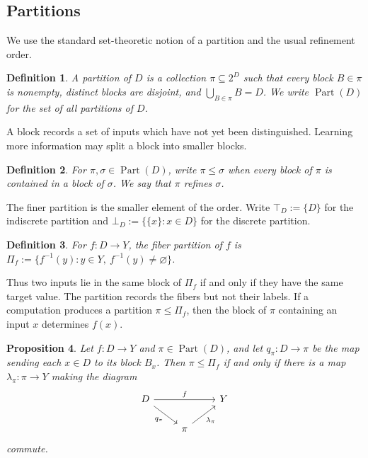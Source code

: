 \documentclass[11pt]{article}
\numberwithin{equation}{section}
\newtheorem{definition}{Definition}[section]
\newtheorem{proposition}[definition]{Proposition}
\theoremstyle{remark}
\newcommand{\Part}{\operatorname{Part}}
\begin{document}
\subsection{Partitions}
\label{subsec:partitions}

We use the standard set-theoretic notion of a partition and the usual
refinement order.

\begin{definition}
\label{def:partition}
A \emph{partition} of $D$ is a collection $\pi\subseteq 2^D$ such that every
block $B\in\pi$ is nonempty, distinct blocks are disjoint, and
$\bigcup_{B\in\pi}B=D$.  We write $\Part(D)$ for the set of all partitions
of $D$.
\end{definition}

A block records a set of inputs which have not yet been distinguished.
Learning more information may split a block into smaller blocks.

\begin{definition}
\label{def:partition-refinement}
For $\pi,\sigma\in\Part(D)$, write $\pi\leq\sigma$ when every block of
$\pi$ is contained in a block of $\sigma$.  We say that $\pi$ \emph{refines}
$\sigma$.
\end{definition}

The finer partition is the smaller element of the order.  Write
$\top_D:=\{D\}$ for the indiscrete partition and
$\bot_D:=\{\{x\}:x\in D\}$ for the discrete partition.

\begin{definition}
\label{def:fiber-partition}
For $f:D\to Y$, the \emph{fiber partition} of $f$ is $\Pi_f:=\{f^{-1}(y):y\in Y,\ f^{-1}(y)\neq\varnothing\}$.
\end{definition}

Thus two inputs lie in the same block of $\Pi_f$ if and only if they have
the same target value. The partition records the fibers but not their labels.
If a computation produces a partition $\pi\leq\Pi_f$, then the block of
$\pi$ containing an input $x$ determines $f(x)$.

\begin{proposition}
\label{prop:partition-computation}
Let $f:D\to Y$ and $\pi\in\Part(D)$, and let
$q_\pi:D\to\pi$ be the map sending each $x\in D$ to its block $B_x$.
Then $\pi\leq\Pi_f$ if and only if there is a map
$\lambda_\pi:\pi\to Y$ making the diagram
\[
\begin{tikzcd}
D \arrow[rr,"f"] \arrow[dr,"q_\pi"'] && Y \\
& \pi \arrow[ur,"\lambda_\pi"'] &
\end{tikzcd}
\]
commute.
\end{proposition}
\end{document}

